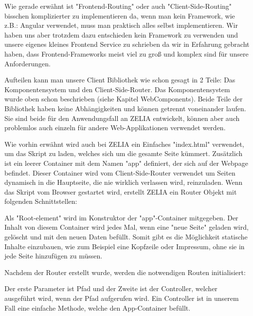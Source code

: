 
Wie gerade erwähnt ist "Frontend-Routing" oder auch "Client-Side-Routing" bisschen komplizierter zu implementieren da, wenn man kein Framework, wie z.B.: Angular verwendet, muss man praktisch alles selbst implementieren. Wir haben uns aber trotzdem dazu entschieden kein Framework zu verwenden und unsere eigenes kleines Frontend Service zu schrieben da wir in Erfahrung gebracht haben, dass Frontend-Frameworks meist viel zu groß und komplex sind für unsere Anforderungen.

Aufteilen kann man unsere Client Bibliothek wie schon gesagt in 2 Teile: Das Komponentensystem und den Client-Side-Router. Das Komponentensystem wurde oben schon beschrieben (siehe Kapitel WebComponents). Beide Teile der Bibliothek haben keine Abhängigkeiten und können getrennt voneinander laufen. Sie sind beide für den Anwendungsfall an ZELIA entwickelt, können aber auch problemlos auch einzeln für andere Web-Applikationen verwendet werden.

Wie vorhin erwähnt wird auch bei ZELIA ein Einfaches "index.html" verwendet, um das Skript zu laden, welches sich um die gesamte Seite kümmert. Zusätzlich ist ein leerer Container mit dem Namen "app" definiert, der sich auf der Webpage befindet. Dieser Container wird vom Client-Side-Router verwendet um Seiten dynamisch in die Hauptseite, die nie wirklich verlassen wird, reinzuladen. Wenn das Skript vom Browser gestartet wird, erstellt ZELIA ein Router Objekt mit folgenden Schnittstellen:


Als "Root-element" wird im Konstruktor der "app"-Container mitgegeben. Der Inhalt von diesem Container wird jedes Mal, wenn eine "neue Seite" geladen wird, gelöscht und mit den neuen Daten befüllt. Somit gibt es die Möglichkeit statische Inhalte einzubauen, wie zum Beispiel eine Kopfzeile oder Impressum, ohne sie in jede Seite hinzufügen zu müssen.

Nachdem der Router erstellt wurde, werden die notwendigen Routen initialisiert:


Der erste Parameter ist Pfad und der Zweite ist der Controller, welcher ausgeführt wird, wenn der Pfad aufgerufen wird. Ein Controller ist in unserem Fall eine einfache Methode, welche den App-Container befüllt.



